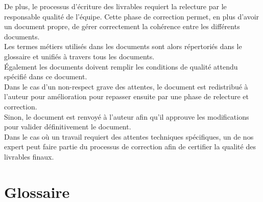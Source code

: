 De plus, le processus d'écriture des livrables requiert la relecture par le
responsable qualité de l'équipe. Cette phase de correction permet, en plus
d'avoir un document propre, de gérer correctement la cohérence entre les
différents documents. \\

Les termes métiers utilisés dans les documents sont alors répertoriés dans le
glossaire et unifiés à travers tous les documents. \\
Également les documents doivent remplir les conditions de qualité attendu
spécifié dans ce document. \\

Dans le cas d'un non-respect grave des attentes, le document est redistribué à
l'auteur pour amélioration pour repasser ensuite par une phase de relecture et
correction. \\
Sinon, le document est renvoyé à l'auteur afin qu'il approuve les modifications
pour valider définitivement le document. \\

Dans le cas où un travail requiert des attentes techniques spécifiques, un de
nos expert peut faire partie du processus de correction afin de certifier la
qualité des livrables finaux. \\

\section{Glossaire}

